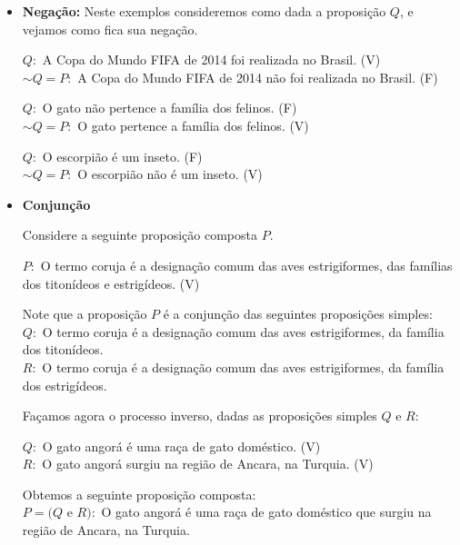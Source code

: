  \begin{itemize}
  \item \textbf{Negação:} Neste exemplos consideremos como dada a proposição $Q$, e vejamos como fica sua negação.
 
  \begin{exem} \label{(Neg. 1)}
    $Q:$ A Copa do Mundo FIFA de 2014 foi realizada no Brasil. (V) \\
    $\sim Q= P:$ A Copa do Mundo FIFA de 2014 não foi realizada no Brasil. (F)
  \end{exem}
 
 \begin{exem} \label{(Neg. 2)}
   $Q:$ O gato não pertence a família dos felinos. (F)\\
   $\sim Q= P:$ O gato pertence a família dos felinos. (V)
 \end{exem}
 
 \begin{exem} \label{(Neg. 3)}
   $Q:$ O escorpião é um inseto. (F)\\
   $\sim Q= P:$ O escorpião não é um inseto. (V)
 \end{exem}
 
 
 \item \textbf{Conjunção}
 
 
  \begin{exem} \label{(E 1)}
 Considere a seguinte proposição composta $P$. 
 
 $P:$ O termo coruja é a designação comum das aves estrigiformes, das famílias dos titonídeos e estrigídeos. (V)
 
 Note que a proposição $P$ é a conjunção das seguintes proposições simples:\\
 $Q:$ O termo coruja é a designação comum das aves estrigiformes, da família dos titonídeos. \\
 $R:$ O termo coruja é a designação comum das aves estrigiformes, da família dos estrigídeos.
 \end{exem}

 \begin{exem} \label{(E 2)}
 Façamos agora o processo inverso, dadas as proposições simples $Q$ e $R$:
 
 $Q:$ O gato angorá é uma raça de gato doméstico. (V)\\
 $R:$ O gato angorá surgiu na região de Ancara, na Turquia. (V)
 
 Obtemos a seguinte proposição composta:\\
 $P= (Q$ e $R):$ O gato angorá é uma raça de gato doméstico que surgiu na região de Ancara, na Turquia.
 

\end{exem}
\end{itemize}
